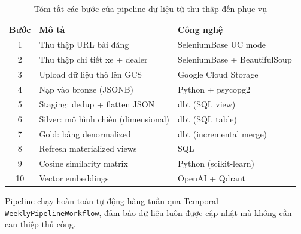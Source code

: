 \begin{table}[H]
\centering
\small
\caption{Tóm tắt các bước của pipeline dữ liệu từ thu thập đến phục vụ}
\label{tab:pipeline-steps}
\begin{tabular}{|c|l|l|}
\hline
\textbf{Bước} & \textbf{Mô tả} & \textbf{Công nghệ} \\
\hline
1 & Thu thập URL bài đăng & SeleniumBase UC mode \\
\hline
2 & Thu thập chi tiết xe + dealer & SeleniumBase + BeautifulSoup \\
\hline
3 & Upload dữ liệu thô lên GCS & Google Cloud Storage \\
\hline
4 & Nạp vào bronze (JSONB) & Python + psycopg2 \\
\hline
5 & Staging: dedup + flatten JSON & dbt (SQL view) \\
\hline
6 & Silver: mô hình chiều (dimensional) & dbt (SQL table) \\
\hline
7 & Gold: bảng denormalized & dbt (incremental merge) \\
\hline
8 & Refresh materialized views & SQL \\
\hline
9 & Cosine similarity matrix & Python (scikit-learn) \\
\hline
10 & Vector embeddings & OpenAI + Qdrant \\
\hline
\end{tabular}
\end{table}

Pipeline chạy hoàn toàn tự động hàng tuần qua Temporal \texttt{WeeklyPipelineWorkflow}, đảm bảo dữ liệu luôn được cập nhật mà không cần can thiệp thủ công.
